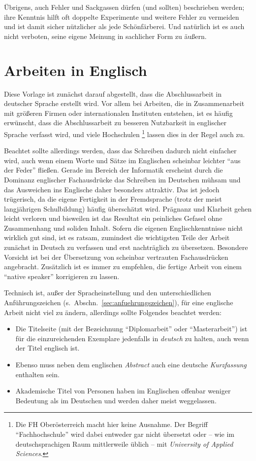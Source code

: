 Übrigens, auch Fehler und Sackgassen dürfen (und sollten)
beschrieben werden; ihre Kenntnis hilft oft doppelte Experimente und
weitere Fehler zu vermeiden und ist damit sicher nützlicher als
jede Schönfärberei.
Und natürlich ist es auch nicht verboten, seine eigene Meinung 
in sachlicher Form zu äußern.


\section{Arbeiten in Englisch}
\label{sec:englisch}

Diese Vorlage ist zunächst darauf abgestellt, dass die
Abschlussarbeit in deutscher Sprache erstellt wird. Vor allem bei
Arbeiten, die in Zusammenarbeit mit größeren Firmen oder
internationalen Instituten entstehen, ist es häufig erwünscht,
dass die Abschlussarbeit zu besseren Nutzbarkeit in englischer
Sprache verfasst wird, und viele Hochschulen%
\footnote{Die FH Oberösterreich macht hier keine Ausnahme. 
Der Begriff "`Fachhochschule"' wird dabei entweder gar nicht
übersetzt oder -- wie im deutschsprachigen Raum mittlerweile üblich -- 
mit \emph{University of Applied Sciences}.
} 
lassen dies in
der Regel auch zu.

Beachtet sollte allerdings werden, dass das Schreiben dadurch nicht
einfacher wird, auch wenn einem Worte und Sätze im Englischen
scheinbar leichter "`aus der Feder"' fließen. Gerade im Bereich
der Informatik erscheint durch die Dominanz englischer
Fachausdrücke das Schreiben im Deutschen mühsam und das Ausweichen
ins Englische daher besonders attraktiv. Das ist jedoch
trügerisch, da die eigene Fertigkeit in der Fremdsprache
(trotz der meist langjährigen Schulbildung) häufig überschätzt wird.
Prägnanz und Klarheit gehen leicht verloren und bisweilen ist das
Resultat ein peinliches Gefasel ohne Zusammenhang und soliden
Inhalt. Sofern die eigenen Englischkenntnisse nicht wirklich gut sind, ist
es ratsam, zumindest die wichtigsten Teile der Arbeit zunächst in
Deutsch zu verfassen und erst nachträglich zu übersetzen. Besondere Vorsicht ist bei der Übersetzung von scheinbar
vertrauten Fachausdrücken angebracht. Zusätzlich ist es immer zu
empfehlen, die fertige Arbeit von einem "`native speaker"'
korrigieren zu lassen.



Technisch ist, außer der Spracheinstellung und den
unterschiedlichen Anführungszeichen (s.\
Abschn.~\ref{sec:anfuehrungszeichen}), für eine englische Arbeit
nicht viel zu ändern, allerdings sollte Folgendes beachtet werden:
%
\begin{itemize}
\item  Die Titelseite (mit der Bezeichnung "`Diplomarbeit"' oder "`Masterarbeit"') 
ist für die einzureichenden Exemplare jedenfalls in \emph{deutsch} zu halten,
auch wenn der Titel englisch ist. 
\item Ebenso muss neben dem
englischen \emph{Abstract} auch eine deutsche \emph{Kurzfassung}
enthalten sein. %
\item Akademische Titel von Personen haben im Englischen offenbar
weniger Bedeutung als im Deutschen und werden daher meist
weggelassen.
\end{itemize}
